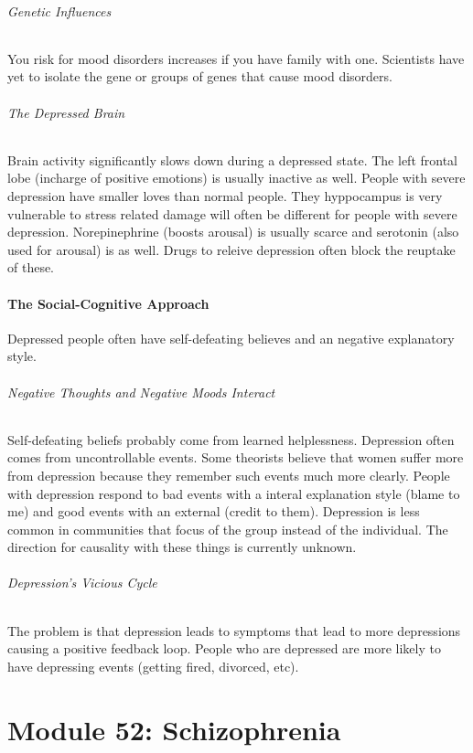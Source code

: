 \documentclass[12pt]{article}
\begin{document}
\paragraph*{Genetic Influences}
You risk for mood disorders increases if you have family with one. Scientists have yet to isolate the gene or groups of genes that cause mood disorders.
\paragraph*{The Depressed Brain}
Brain activity significantly slows down during a depressed state. The left frontal lobe (incharge of positive emotions) is usually inactive as well. People with severe depression have smaller loves than normal people. They hyppocampus is very vulnerable to stress related damage will often be different for people with severe depression. Norepinephrine (boosts arousal) is usually scarce and serotonin (also used for arousal) is as well. Drugs to releive depression often block the reuptake of these.
\subsection*{The Social-Cognitive Approach}
Depressed people often have self-defeating believes and an negative explanatory style. 
\paragraph*{Negative Thoughts and Negative Moods Interact}
Self-defeating beliefs probably come from learned helplessness. Depression often comes from uncontrollable events. Some theorists believe that women suffer more from depression because they remember such events much more clearly. People with depression respond to bad events with a interal explanation style (blame to me) and good events with an external (credit to them). Depression is less common in communities that focus of the group instead of the individual. The direction for causality with these things is currently unknown.
\paragraph*{Depression's Vicious Cycle}
The problem is that depression leads to symptoms that lead to more depressions causing a positive feedback loop. People who are depressed are more likely to have depressing events (getting fired, divorced, etc).

\part*{Module 52: Schizophrenia}
\end{document}
